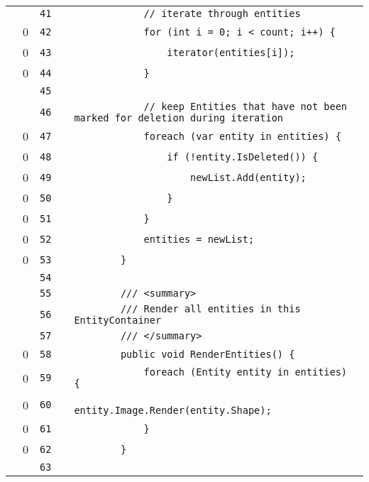 \documentclass[a4paper,landscape,10pt]{article}
\begin{document}
\begin{longtable}[l]{lrrll}
\cellcolor{gray} &  & \verb~41~ & & \verb~            // iterate through entities~\\
\cellcolor{red} & 0 & \verb~42~ & & \verb~            for (int i = 0; i < count; i++) {~\\
\cellcolor{red} & 0 & \verb~43~ & & \verb~                iterator(entities[i]);~\\
\cellcolor{red} & 0 & \verb~44~ & & \verb~            }~\\
\cellcolor{gray} &  & \verb~45~ & & \verb~~\\
\cellcolor{gray} &  & \verb~46~ & & \verb~            // keep Entities that have not been marked for deletion during iteration~\\
\cellcolor{red} & 0 & \verb~47~ & & \verb~            foreach (var entity in entities) {~\\
\cellcolor{red} & 0 & \verb~48~ & & \verb~                if (!entity.IsDeleted()) {~\\
\cellcolor{red} & 0 & \verb~49~ & & \verb~                    newList.Add(entity);~\\
\cellcolor{red} & 0 & \verb~50~ & & \verb~                }~\\
\cellcolor{red} & 0 & \verb~51~ & & \verb~            }~\\
\cellcolor{red} & 0 & \verb~52~ & & \verb~            entities = newList;~\\
\cellcolor{red} & 0 & \verb~53~ & & \verb~        }~\\
\cellcolor{gray} &  & \verb~54~ & & \verb~~\\
\cellcolor{gray} &  & \verb~55~ & & \verb~        /// <summary>~\\
\cellcolor{gray} &  & \verb~56~ & & \verb~        /// Render all entities in this EntityContainer~\\
\cellcolor{gray} &  & \verb~57~ & & \verb~        /// </summary>~\\
\cellcolor{red} & 0 & \verb~58~ & & \verb~        public void RenderEntities() {~\\
\cellcolor{red} & 0 & \verb~59~ & & \verb~            foreach (Entity entity in entities) {~\\
\cellcolor{red} & 0 & \verb~60~ & & \verb~                entity.Image.Render(entity.Shape);~\\
\cellcolor{red} & 0 & \verb~61~ & & \verb~            }~\\
\cellcolor{red} & 0 & \verb~62~ & & \verb~        }~\\
\cellcolor{gray} &  & \verb~63~ & & \verb~~\\

\end{longtable}
\end{document}
